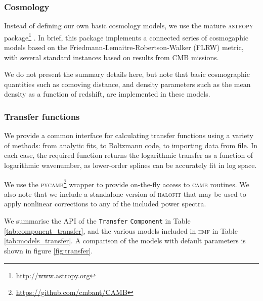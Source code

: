 \documentclass[5p]{elsarticle}
\newcommand{\bd}[1]{\textcolor{purple}{\textbf{[BD: #1]}}}
\begin{document}
\subsubsection{Cosmology}
\label{sec:halomod:components:cosmology}
Instead of defining our own basic cosmology models, we use the mature \textsc{astropy} package\footnote{\url{http://www.astropy.org}} \citep{Robitaille2013}. In brief, this package implements a connected series of cosmogaphic models based on the Friedmann-Lemaitre-Robertson-Walker (FLRW) metric, with several standard instances based on results from CMB missions. 

We do not present the summary details here, but note that basic cosmographic quantities such as comoving distance, and density parameters such as the mean density as a function of redshift, are implemented in these models. 

\subsubsection{Transfer functions}
\label{sec:halomod:components:transfer}
We provide a common interface for calculating transfer functions using a variety of methods: from analytic fits, to Boltzmann code, to importing data from file. In each case, the required function returns the logarithmic transfer as a function of logarithmic wavenumber, as lower-order splines can be accurately fit in log space. 

We use the \textsc{pycamb}\footnote{\url{https://github.com/cmbant/CAMB}} wrapper to provide on-the-fly access to \textsc{camb} routines. We also note that we include a standalone version of \textsc{halofit} that may be used to apply nonlinear corrections to any of the included power spectra.

We summarise the API of the \verb|Transfer| \verb|Component| in Table \ref{tab:component_transfer}, and the various models included in \textsc{hmf} in Table \ref{tab:models_transfer}. A comparison of the models with default parameters is shown in figure \ref{fig:transfer}.

\end{document}
